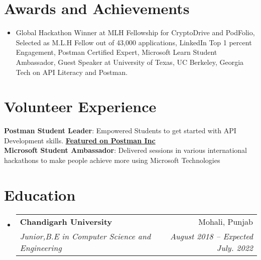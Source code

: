\documentclass[letterpaper,11pt]{article}
\makeatletter
\newcommand{\resumeSubheading}[4]{
  \vspace{-2pt}\item
    \begin{tabular*}{0.97\textwidth}[t]{l@{\extracolsep{\fill}}r}
      \textbf{#1} & #2 \\
      \textit{\small#3} & \textit{\small #4} \\
    \end{tabular*}\vspace{-7pt}
}
\newcommand{\resumeSubHeadingListStart}{\begin{itemize}[leftmargin=0.15in, label={}]}
\newcommand{\resumeSubHeadingListEnd}{\end{itemize}}
\makeatother
\begin{document}
\section{Awards and Achievements}
 \begin{itemize}[leftmargin=0.15in, label={}]
    \small\item{Global Hackathon Winner at MLH Fellowship for CryptoDrive and PodFolio, Selected as M.L.H Fellow out of 43,000 applications, LinkedIn Top 1 percent Engagement, Postman Certified Expert, Microsoft Learn Student Ambassador, Guest Speaker at University of Texas, UC Berkeley, Georgia Tech on API Literacy and Postman.
    }
 \end{itemize}
 \section{Volunteer Experience}
 \begin{itemize}[leftmargin=0.15in, label={}]
    \small{\item{
     \textbf{Postman Student Leader}{: Empowered Students to get started with API Development skills. \textbf{\href{https://blog.postman.com/announcing-the-postman-student-leader-program/}{Featured on Postman Inc}} } \\
     \textbf{Microsoft Student Ambassador}{: Delivered sessions in various international hackathons to make people achieve more using Microsoft Technologies }
    }}
 \end{itemize}
\section{Education}
  \resumeSubHeadingListStart
    \resumeSubheading
      {Chandigarh University}{Mohali, Punjab}
      {Junior,B.E in Computer Science and Engineering}{August 2018 -- Expected July. 2022}
  \resumeSubHeadingListEnd
\end{document}
